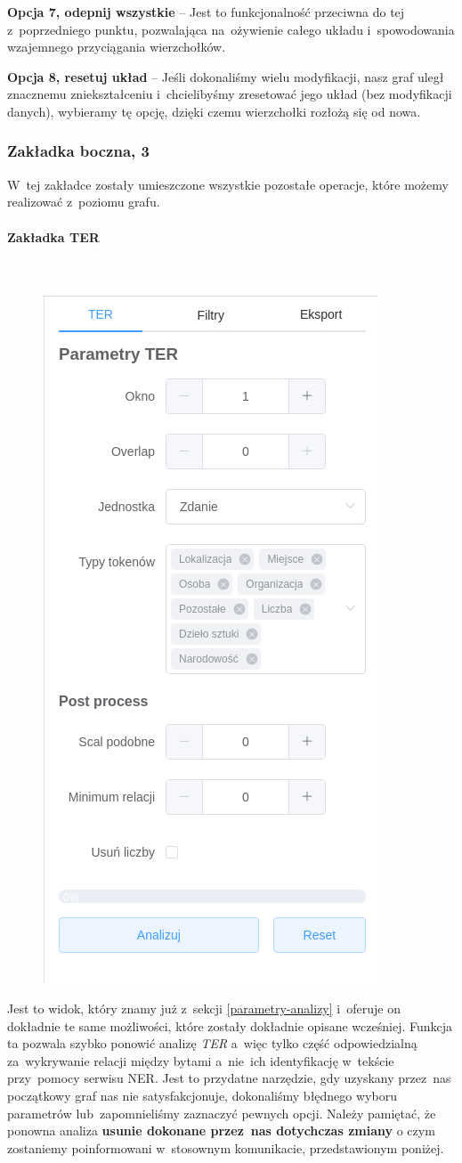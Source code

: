 \documentclass[12pt, a4paper]{article}
\newcommand{\subsubsubsection}[1]{\paragraph{#1}\mbox{}\\}
\begin{document}
\noindent \textbf{Opcja 7, odepnij wszystkie} -- Jest to funkcjonalność przeciwna do tej z~poprzedniego punktu, pozwalająca na~ożywienie całego układu i~spowodowania wzajemnego przyciągania wierzchołków.

\noindent \textbf{Opcja 8, resetuj układ} -- Jeśli dokonaliśmy wielu modyfikacji, nasz graf uległ znacznemu zniekształceniu i~chcielibyśmy zresetować jego układ (bez modyfikacji danych), wybieramy tę opcję, dzięki czemu wierzchołki rozłożą się od nowa.

\subsubsection{Zakładka boczna, 3}

W~tej zakładce zostały umieszczone wszystkie pozostałe operacje, które możemy realizować z~poziomu grafu.

\subsubsubsection{Zakładka TER}

\begin{figure}[H]
  \centering
  \includegraphics[width=0.4\linewidth]{images/graph-ter.png}
\end{figure}

Jest to widok, który znamy już z~sekcji \ref{parametry-analizy} i~oferuje on dokładnie te same możliwości, które zostały dokładnie opisane wcześniej. Funkcja ta pozwala szybko ponowić analizę \textit{TER} a~więc tylko część odpowiedzialną za~wykrywanie relacji między bytami a~nie~ich identyfikację w~tekście przy~pomocy serwisu NER. Jest to przydatne narzędzie, gdy uzyskany przez~nas początkowy graf nas nie satysfakcjonuje, dokonaliśmy błędnego wyboru parametrów lub~zapomnieliśmy zaznaczyć pewnych opcji. Należy pamiętać, że ponowna analiza \textbf{usunie dokonane przez~nas dotychczas zmiany} o czym zostaniemy poinformowani w~stosownym komunikacie, przedstawionym poniżej.
\end{document}
